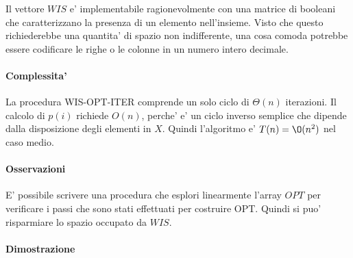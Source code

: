 Il vettore $WIS$ e' implementabile ragionevolmente con una matrice di booleani che caratterizzano la presenza di un elemento nell'insieme. Visto che questo richiederebbe una quantita' di spazio non indifferente, una cosa comoda potrebbe essere codificare le righe o le colonne in un numero intero decimale.

\paragraph{Complessita'}

La procedura WIS-OPT-ITER comprende un solo ciclo di $\Theta(n)$ iterazioni.
Il calcolo di $p(i)$ richiede $O(n)$, perche' e' un ciclo inverso semplice che dipende dalla disposizione degli elementi in $X$.
Quindi l'algoritmo e' $T(n) = \O(n^2)$ nel caso medio.

\paragraph{Osservazioni}

E' possibile scrivere una procedura che esplori linearmente l'array $OPT$ per verificare i passi che sono stati effettuati per costruire OPT. Quindi si puo' risparmiare lo spazio occupato da $WIS$.

\paragraph{Dimostrazione}

